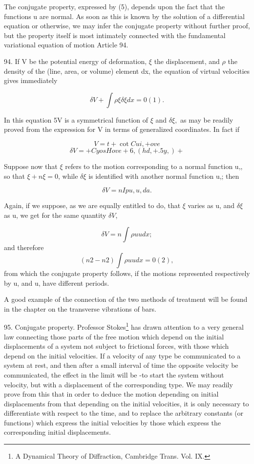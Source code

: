 The conjugate property, expressed by (5), depends upon the fact that the
functions u are normal. As soon as this is known by the solution of a
differential equation or otherwise, we may infer the conjugate property without
further proof, but the property itself is most intimately connected with the
fundamental variational equation of motion Article 94.

94. If V be the potential energy of deformation, \(\xi\) the displacement, and
\(\rho\) the density of the (line, area, or volume) element dx, the equation of
virtual velocities gives immediately

\[\delta V + \int \rho \xi \delta \xi dx =0 (1).\]

In this equation 5V is a symmetrical function of \(\xi\) and \(\delta \xi,\) as
may be readily proved from the expression for V in terms of generalized
coordinates. In fact if

\[V = t + \cot Cui, + ove\]
\[\delta V =  + Cy os Hove +6, (hd, + .5y,) +\]

Suppose now that \(\xi\) refers to the motion corresponding to a normal
function u,, so that \(\xi +n \xi =0\), while \(\delta \xi\) is identified with
another normal function u,; then

\[\delta V =  n I p u,u,da.\]

Again, if we suppose, as we are equally entitled to do, that \(\xi\) varies as
u, and \(\delta \xi\) as u, we get for the same quantity \(\delta V\),

\[\delta V =  n \int \rho u u dx;\]
and therefore
\[(n2 - n2) \int \rho  u  u dx  =0 (2),\]
from which the conjugate property follows, if the motions
represented respectively by u, and u, have different periods.

A good example of the connection of the two methods of treatment will be found
in the chapter on the transverse vibrations of bars.

95.  Conjugate property.
Professor Stokes\footnote{A Dynamical Theory of Diffraction, Cambridge
Trans. Vol. IX.} has drawn attention to a very general law connecting those
parts of the free motion which depend on the initial displacements of a system
not subject to frictional forces, with those which depend on the initial
velocities. If a velocity of any type be communicated to a system at rest, and
then after a small interval of time the opposite velocity be communicated, the
effect in the limit will be -to start the system without velocity, but with a
displacement of the corresponding type. We may readily prove from this that in
order to deduce the motion depending on initial displacements from that
depending on the initial velocities, it is only necessary to differentiate with
respect to the time, and to replace the arbitrary constants (or functions)
which express the initial velocities by those which express the corresponding
initial displacements.

